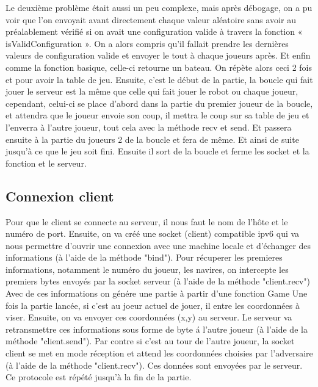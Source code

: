 \documentclass{article}
\begin{document}
	Le deuxième problème était aussi un peu complexe, mais après débogage, on a pu voir que l’on envoyait avant directement chaque valeur aléatoire sans avoir au préalablement vérifié si on avait une configuration valide à travers la fonction « isValidConfiguration ».
	On a alors compris qu’il fallait prendre les dernières valeurs de configuration valide et envoyer le tout à chaque joueurs après.
	Et enfin comme la fonction basique, celle-ci retourne un bateau. On répète alors ceci 2 fois et pour avoir la table de jeu.
	Ensuite, c’est le début de la partie, la boucle qui fait jouer le serveur est la même que celle qui fait jouer le robot ou chaque joueur, cependant, celui-ci se place d’abord dans la partie du premier joueur de la boucle, et attendra que le joueur envoie son coup, il mettra le coup sur sa table de jeu et  l’enverra à l’autre joueur, tout cela avec la méthode recv et send. Et passera ensuite à la partie du joueurs 2 de la boucle et fera de même. Et ainsi de suite jusqu’à ce que le jeu soit fini. Ensuite il sort de la boucle et ferme les socket et la fonction et le serveur.

	\subsection{Connexion client}
	Pour que le client se connecte au serveur, il nous faut le nom de l'h\^ote et le num\'ero de port.
	\newline Ensuite, on va cr\'e\'e une socket (client) compatible ipv6 qui va nous permettre d'ouvrir une connexion avec une machine locale et d'\'echanger des informations (\`a l'aide de la m\'ethode "bind").
	\newline Pour r\'ecuperer les premieres informations, notamment le num\'ero du joueur, les navires, on intercepte les premiers bytes envoyés par la socket serveur (\`a l'aide de la m\'ethode "client.recv")
	\newline Avec de ces informations on g\'en\'ere une partie \`a partir d'une fonction Game
	\newline Une fois la partie lanc\'ee, si c'est au joeur actuel de jouer, il entre les coordonn\'ees \`a viser. Ensuite, on va envoyer ces coordonn\'ees (x,y) au serveur. Le serveur va retransmettre ces informations sous forme de byte \'a l'autre joueur (\`a l'aide de la m\'ethode "client.send").
	\newline Par contre si c'est au tour de l'autre joueur, la socket client se met en mode r\'eception et attend les coordonn\'ees choisies par l'adversaire (\`a l'aide de la m\'ethode "client.recv"). Ces donn\'ees sont envoy\'ees par le serveur. 
	\newline Ce protocole est r\'ep\'et\'e jusqu'\`a la fin de la partie.
\end{document}
